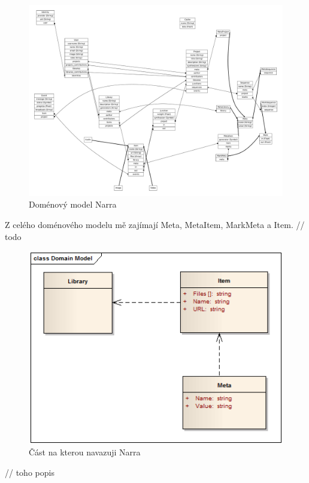 \begin{figure}[h]
\includegraphics{./obrazova_priloha/domain_full.pdf}
\caption{Doménový model Narra}
\end{figure}

\par Z celého doménového modelu mě zajímají Meta, MetaItem, MarkMeta a Item.
// todo

\begin{figure}[h]
\includegraphics{./obrazova_priloha/domain_my.png}
\caption{Část na kterou navazuji Narra}
\end{figure}
\par // toho popis
